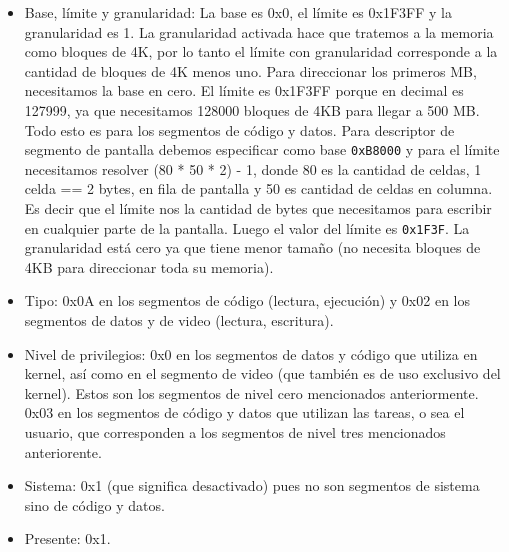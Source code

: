 \begin{itemize}
\item Base, límite y granularidad: La base es 0x0, el límite es 0x1F3FF y la granularidad es 1. La granularidad activada hace que tratemos a la memoria como bloques de 4K, por lo tanto el límite con granularidad corresponde a la cantidad de bloques de 4K menos uno. Para direccionar los primeros MB, necesitamos la base en cero. El límite es 0x1F3FF porque en decimal es 127999, ya que necesitamos 128000 bloques de 4KB para llegar a 500 MB. Todo esto es para los segmentos de código y datos. Para descriptor de segmento de pantalla debemos especificar como base \verb|0xB8000| y para el límite necesitamos resolver (80 * 50 * 2) - 1, donde 80 es la cantidad de celdas, 1 celda == 2 bytes, en fila de pantalla y 50 es cantidad de celdas en columna. Es decir que el límite nos la cantidad de bytes que necesitamos para escribir en cualquier parte de la pantalla. Luego el valor del límite es \verb|0x1F3F|. La granularidad está cero ya que tiene menor tamaño (no necesita bloques de 4KB para direccionar toda su memoria).
\item Tipo: 0x0A en los segmentos de código (lectura, ejecución) y 0x02 en los segmentos de datos y de video (lectura, escritura).
\item Nivel de privilegios: 0x0 en los segmentos de datos y código que utiliza en kernel, así como en el segmento de video (que también es de uso exclusivo del kernel). Estos son los segmentos de nivel cero mencionados anteriormente. 0x03 en los segmentos de código y datos que utilizan las tareas, o sea el usuario, que corresponden a los segmentos de nivel tres mencionados anteriorente.
\item Sistema: 0x1 (que significa desactivado) pues no son segmentos de sistema sino de código y datos.
\item Presente: 0x1.
\end{itemize}

